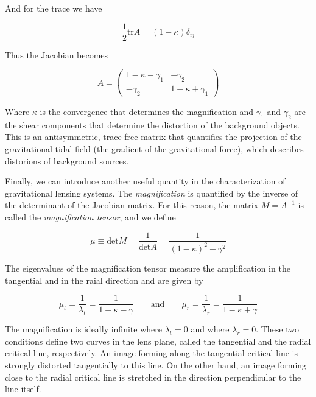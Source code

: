 And for the trace we have

\begin{equation}
\frac{1}{2}\text{tr}A=(1-\kappa)\delta_{ij}
\end{equation}

Thus the Jacobian becomes 

\begin{equation}
A= \left(\begin{array}{cc}
1-\kappa-\gamma_{1} & -\gamma_{2}\\
-\gamma_{2} & 1-\kappa+\gamma_{1}
\end{array}\right)
\end{equation}

Where $\kappa$ is the convergence that determines the magnification and $\gamma_{1}$ and $\gamma_{2}$ are the shear components that determine the distortion of the background objects. This is an antisymmetric, trace-free matrix that quantifies the projection of the gravitational tidal field (the gradient of the gravitational force), which describes distorions of background sources.

Finally, we can introduce another useful quantity in the characterization of gravitational lensing systems. The \textit{magnification} is quantified by the inverse of the determinant of the Jacobian matrix. For this reason, the matrix $M=A^{-1}$ is called the \textit{magnification tensor}, and we define

\begin{equation}
\mu \equiv \text{det} M = \frac{1}{\text{det}A}=\frac{1}{(1-\kappa)^2-\gamma^2}
\end{equation}

The eigenvalues of the magnification tensor measure the amplification in the tangential and in the raial direction and are given by

\begin{equation}
\mu_t = \frac{1}{\lambda_t}=\frac{1}{1-\kappa - \gamma} \qquad \text{and} \qquad  \mu_r = \frac{1}{\lambda_r}=\frac{1}{1-\kappa + \gamma}
\end{equation}

The magnification is ideally infinite where $\lambda_t=0$ and where $\lambda_r=0$. These two conditions define two curves in the lens plane, called the tangential and the radial critical line, respectively. An image forming along the tangential critical line is strongly distorted tangentially to this line. On the other hand, an image forming close to the radial critical line is stretched in the direction perpendicular to the line itself. 

